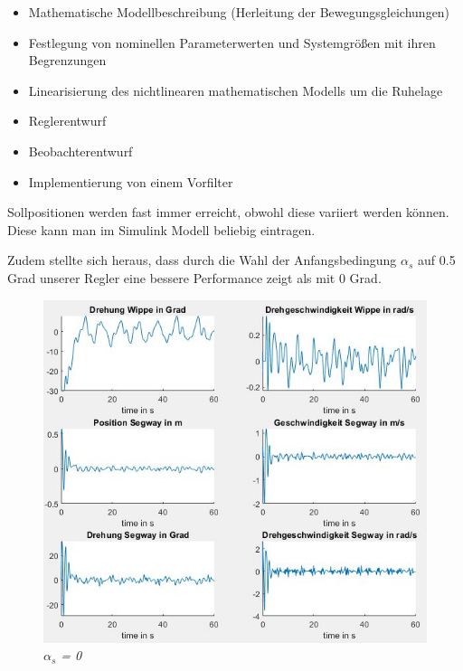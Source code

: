\documentclass[pdf]{ifacconf}
\begin{document}
\begin{itemize}
\item Mathematische Modellbeschreibung (Herleitung der Bewegungsgleichungen)  
\item Festlegung von nominellen Parameterwerten und Systemgrößen mit ihren Begrenzungen  
\item Linearisierung des nichtlinearen mathematischen Modells um die Ruhelage
\item Reglerentwurf
\item Beobachterentwurf
\item Implementierung von einem Vorfilter
\end{itemize}

Sollpositionen werden fast immer erreicht, obwohl diese variiert werden können. Diese kann man im Simulink Modell beliebig eintragen.

Zudem stellte sich heraus, dass durch die Wahl der Anfangsbedingung $\alpha^{}_{s}$ auf 0.5 Grad unserer Regler eine bessere Performance zeigt als mit 0 Grad.  

\begin{figure}[h]	
\centerline{\includegraphics[width=\linewidth]{Bilder/Alf0undRef0.jpg}}
	\label{fig:Alf0undRef0}
	\caption{\textit{$\alpha^{}_{s}$ = 0}}
\end{figure}
\end{document}
